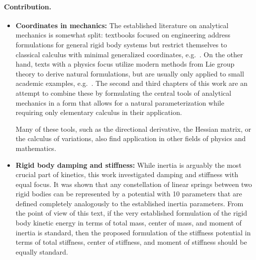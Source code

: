 
\paragraph{Contribution.}
\begin{itemize}
\item \textbf{Coordinates in mechanics:}
The established literature on analytical mechanics is somewhat split: textbooks focused on engineering address formulations for general rigid body systems but restrict themselves to classical calculus with minimal generalized coordinates, e.g.\ \cite{Schwertassek:MultibodySystems}.
On the other hand, texts with a physics focus utilize modern methods from Lie group theory to derive natural formulations, but are usually only applied to small academic examples, e.g.\ \cite{Marsden:MechanicsAndSymmetry}.
The second and third chapters of this work are an attempt to combine these by formulating the central tools of analytical mechanics in a form that allows for a natural parameterization while requiring only elementary calculus in their application.

Many of these tools, such as the directional derivative, the Hessian matrix, or the calculus of variations, also find application in other fields of physics and mathematics.

\item \textbf{Rigid body damping and stiffness:}
While inertia is arguably the most crucial part of kinetics, this work investigated damping and stiffness with equal focus.
It was shown that any constellation of linear springs between two rigid bodies can be represented by a potential with 10 parameters that are defined completely analogously to the established inertia parameters.
From the point of view of this text, if the very established formulation of the rigid body kinetic energy in terms of total mass, center of mass, and moment of inertia is standard, then the proposed formulation of the stiffness potential in terms of total stiffness, center of stiffness, and moment of stiffness should be equally standard.


\end{itemize}
